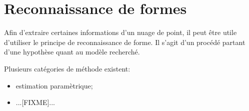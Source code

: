 \section{Reconnaissance de formes}

Afin d'extraire certaines informations d'un nuage de point, il peut être utile d'utiliser le principe de reconnaissance de forme. Il s'agit d'un procédé partant d'une hypothèse quant au modèle recherché.

Plusieurs catégories de méthode existent:

\begin{itemize}
  \item estimation paramètrique;
  \item ...[FIXME]...
\end{itemize}

\begin{definition}[]
  
\end{definition}

